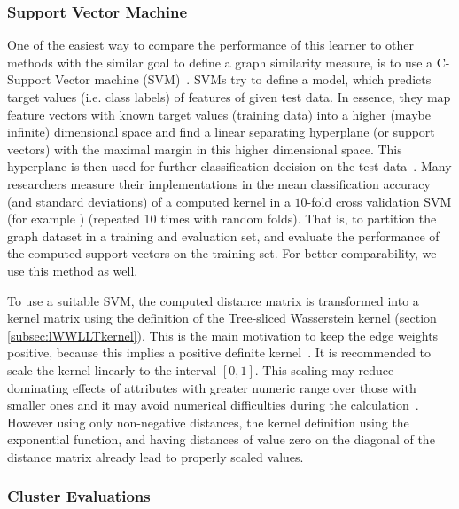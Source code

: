 	\subsubsection{Support Vector Machine} \label{subsec:method_svm}
	
		One of the easiest way to compare the performance of this learner to other methods with the similar goal to define a graph similarity measure, is to use a C-Support Vector machine (SVM)~\cite{1992_Boser_CONF, 2003_Hsu_CONF}.		
		SVMs try to define a model, which predicts target values (i.e. class labels) of features of given test data.		
		In essence, they map feature vectors with known target values (training data) into a higher (maybe infinite) dimensional space and find a linear separating hyperplane (or support vectors) with the maximal margin in this higher dimensional space.
		This hyperplane is then used for further classification decision on the test data~\cite{1992_Boser_CONF}. 
		Many researchers measure their implementations in the mean classification accuracy (and standard deviations) of a computed kernel in a $10$-fold cross validation SVM (for example \cite{2016_Kriege_NIPS, 2019_Schulz_CONF, 2011_Shervashidze_JMLR, 2020_Siglidis_CONF}) (repeated 10 times with random folds).
		That is, to partition the graph dataset in a training and evaluation set, and evaluate the performance of the computed support vectors on the training set.
		For better comparability, we use this method as well.
		
		To use a suitable SVM, the computed distance matrix is transformed into a kernel matrix using the definition of the Tree-sliced Wasserstein kernel (section \ref{subsec:lWWLLTkernel}).
		This is the main motivation to keep the edge weights positive, because this implies a positive definite kernel~\cite{2019_Le_NIPS}.
		It is recommended to scale the kernel linearly to the interval $[0,1]$.
		This scaling may reduce dominating effects of attributes with greater numeric range over those with smaller ones and it may avoid numerical difficulties during the calculation~\cite{2003_Hsu_CONF}.
		However using only non-negative distances, the kernel definition using the exponential function, and having distances of value zero on the diagonal of the distance matrix already lead to properly scaled values.
	
	\subsubsection{Cluster Evaluations} \label{subsec:method_cl_eval}
	
